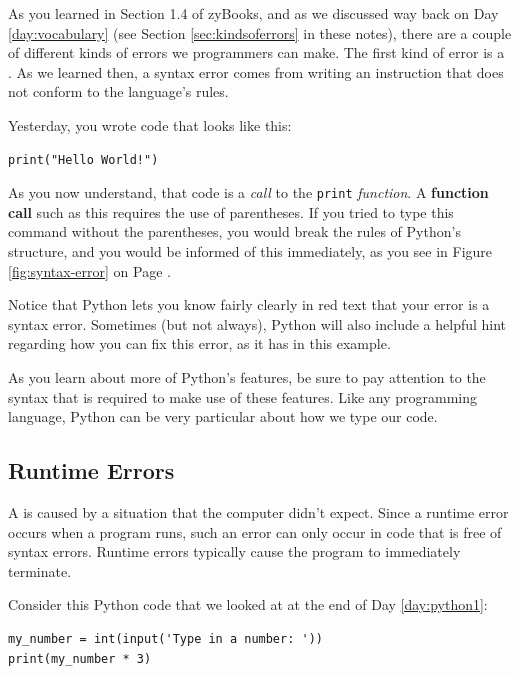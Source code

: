As you learned in Section 1.4 of zyBooks, and as we discussed way back on Day \ref{day:vocabulary} (see Section \ref{sec:kindsoferrors} in these notes), there are a couple of different kinds of errors we programmers can make.  The first kind of error is a .  As we learned then, a syntax error comes from writing an instruction that does not conform to the language's rules.

Yesterday, you wrote code that looks like this:

\begin{verbatim}
print("Hello World!")
\end{verbatim}

As you now understand, that code is a \textit{call} to the \texttt{print} \textit{function}.  A \textbf{function call} such as this requires the use of parentheses.  If you tried to type this command without the parentheses, you would break the rules of Python's structure, and you would be informed of this immediately, as you see in Figure \ref{fig:syntax-error} on Page \pageref{fig:syntax-error}.

Notice that Python lets you know fairly clearly in red text that your error is a syntax error.  Sometimes (but not always), Python will also include a helpful hint regarding how you can fix this error, as it has in this example.

As you learn about more of Python's features, be sure to pay attention to the syntax that is required to make use of these features.  Like any programming language, Python can be very particular about how we type our code.

\subsection{Runtime Errors}

A  is caused by a situation that the computer didn't expect.  Since a runtime error occurs when a program runs, such an error can only occur in code that is free of syntax errors.  Runtime errors typically cause the program to immediately terminate.

Consider this Python code that we looked at at the end of Day \ref{day:python1}:

\begin{verbatim}
my_number = int(input('Type in a number: '))
print(my_number * 3)
\end{verbatim}

